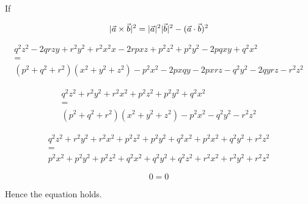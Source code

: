 If

\[
\lvert\vec{a}\times\vec{b}\rvert^2 = \lvert\vec{a}\rvert^2\lvert\vec{b}\rvert^2- (\vec{a}\cdot\vec{b})^2 \\
\]

\begin{multline*}
    q^2z^2 -2qrzy + r^2y^2 + r^2x^2x - 2rpxz + p^2z^2 + p^2y^2 - 2pqxy + q^2x^2 \\ 
    = \\
    (p^2 + q^2 + r^2)(x^2 + y^2 + z^2) - p^2x^2 - 2pxqy - 2pxrz - q^2y^2 - 2qyrz - r^2z^2
\end{multline*}

\begin{multline*}
    q^2z^2 + r^2y^2 + r^2x^2 + p^2z^2 + p^2y^2 + q^2x^2 \\ 
    = \\
    (p^2 + q^2 + r^2)(x^2 + y^2 + z^2) - p^2x^2 - q^2y^2 - r^2z^2
\end{multline*}

\begin{multline*}
    q^2z^2 + r^2y^2 + r^2x^2 + p^2z^2 + p^2y^2 + q^2x^2 + p^2x^2 + q^2y^2 + r^2z^2 \\
    = \\
    p^2x^2 + p^2y^2 + p^2z^2 + q^2x^2 + q^2y^2 + q^2z^2 + r^2x^2 + r^2y^2 + r^2z^2 %
\end{multline*}

\[
    0 = 0
\]

Hence the equation holds.
